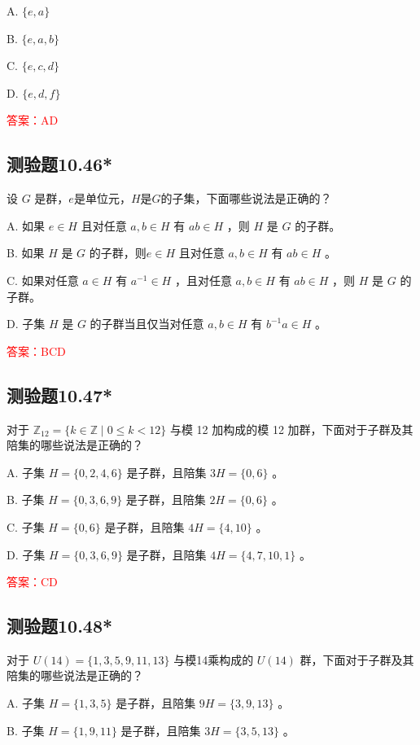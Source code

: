 \documentclass[UTF8, heading=true]{ctexart}
\begin{document}
A. $\{e, a\}$

B. $\{e, a, b\}$

C. $\{e, c, d\}$

D. $\{e, d, f\}$

\textcolor{red}{答案：AD}

\subsection{测验题10.46*}

设 $G$ 是群，$e$是单位元，$H$是$G$的子集，下面哪些说法是正确的？

A. 如果 $e \in H$ 且对任意 $a, b \in H$ 有 $a b \in H$ ，则 $H$ 是 $G$ 的子群。

B. 如果 $H$ 是 $G$ 的子群，则$e \in H$ 且对任意 $a, b \in H$ 有 $a b \in H$ 。

C. 如果对任意 $a \in H$ 有 $a^{-1} \in H$ ，且对任意 $a, b \in H$ 有 $a b \in H$ ，则 $H$ 是 $G$ 的子群。

D. 子集 $H$ 是 $G$ 的子群当且仅当对任意 $a, b \in H$ 有 $b^{-1} a \in H$ 。

\textcolor{red}{答案：BCD}

\subsection{测验题10.47*}

对于 $\mathbb{Z}_{12}=\{k \in \mathbb{Z} \mid 0 \leq k<12\}$ 与模 12 加构成的模 12 加群，下面对于子群及其陪集的哪些说法是正确的？

A. 子集 ${H}=\{0,2,4,6\}$ 是子群，且陪集 $3 {H}=\{0,6\}$ 。

B. 子集 ${H}=\{0,3,6,9\}$ 是子群，且陪集 $2 {H}=\{0,6\}$ 。

C. 子集 $H=\{0,6\}$ 是子群，且陪集 $4 {H}=\{4,10\}$ 。

D. 子集 ${H}=\{0,3,6,9\}$ 是子群，且陪集 $4 {H}=\{4,7,10,1\}$ 。

\textcolor{red}{答案：CD}

\subsection{测验题10.48*}

对于 ${U}(14)=\{1,3,5,9,11,13\}$ 与模14乘构成的 $U(14)$ 群，下面对于子群及其陪集的哪些说法是正确的？

A. 子集 ${H}=\{1,3,5\}$ 是子群，且陪集 $9 {H}=\{3,9,13\}$ 。

B. 子集 $H=\{1,9,11\}$ 是子群，且陪集 $3 H=\{3,5,13\}$ 。
\end{document}
